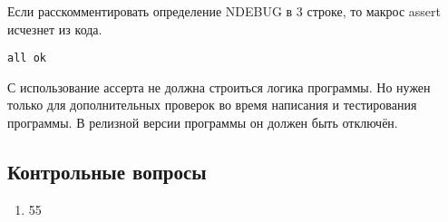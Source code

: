\documentclass[myc.tex]{subfiles}
\begin{document}
Если расскомментировать определение NDEBUG в 3 строке, то макрос assert исчезнет из кода.

\begin{verbatim}
all ok
\end{verbatim} 


С использование ассерта не должна строиться логика программы. Но нужен только для дополнительных проверок во время написания и тестирования программы. В релизной версии программы он должен быть отключён.






\vfill
\subsection*{Контрольные вопросы}
\begin{enumerate}
\item 55
\end{enumerate}
\end{document}
